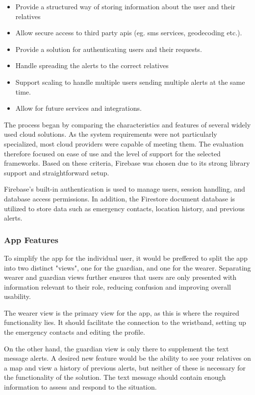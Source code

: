 \begin{itemize}
    \item Provide a structured way of storing information about the user and their relatives
    \item Allow secure access to third party \gls{api}s (eg. \gls{sms} services, geodecoding etc.).
    \item Provide a solution for authenticating users and their requests.
    \item Handle spreading the alerts to the correct relatives
    \item Support scaling to handle multiple users sending multiple alerts at the same time.
    \item Allow for future services and integrations.
\end{itemize}

The process began by comparing the characteristics and features of several widely used cloud solutions. As the system requirements were not particularly specialized, most cloud providers were capable of meeting them. The evaluation therefore focused on ease of use and the level of support for the selected frameworks. Based on these criteria, Firebase was chosen \cite{noauthor_firebase_nodate} due to its strong library support and straightforward setup.

Firebase’s built-in authentication is used to manage users, session handling, and database access permissions. In addition, the Firestore document database is utilized to store data such as emergency contacts, location history, and previous alerts.

\subsubsection{App Features}
To simplify the app for the individual user, it would be preffered to split the app into two distinct "views", one for the guardian, and one for the wearer. Separating wearer and guardian views further ensures that users are only presented with information relevant to their role, reducing confusion and improving overall usability.

The wearer view is the primary view for the app, as this is where the required functionality lies. It should facilitate the connection to the wristband, setting up the emergency contacts and editing the  profile.

On the other hand, the guardian view is only there to supplement the text message alerts. A desired new feature would be the ability to see your relatives on a map and view a history of previous alerts, but neither of these is necessary for the functionality of the solution. The text message should contain enough information to assess and respond to the situation.

